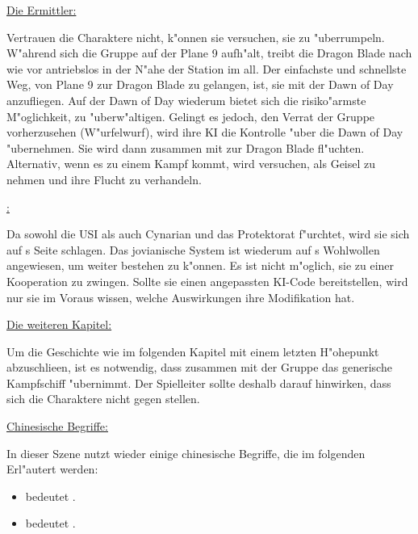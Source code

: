 \begin{remarks}	
	\underline{Die Ermittler:}
	
	Vertrauen die Charaktere \xl{} nicht, k"onnen sie versuchen, sie zu "uberrumpeln. W"ahrend sich die Gruppe auf der Plane 9 aufh"alt, treibt die Dragon Blade nach wie vor antriebslos in der N"ahe der Station im all. Der einfachste und schnellste Weg, von Plane 9 zur Dragon Blade zu gelangen, ist, sie mit der Dawn of Day anzufliegen. Auf der Dawn of Day wiederum bietet sich die risiko"armste M"oglichkeit, \xl{} zu "uberw"altigen. Gelingt es \xl{} jedoch, den Verrat der Gruppe vorherzusehen (W"urfelwurf), wird ihre KI die Kontrolle "uber die Dawn of Day "ubernehmen. Sie wird dann zusammen mit \ml{} zur Dragon Blade fl"uchten. Alternativ, wenn es zu einem Kampf kommt, wird \xl{} versuchen, \ml{} als Geisel zu nehmen und ihre Flucht zu verhandeln.

	\underline{\ml{}:}

	Da \ml{} sowohl die USI als auch Cynarian und das Protektorat f"urchtet, wird sie sich auf \xl{}s Seite schlagen. Das jovianische System ist wiederum auf \ml{}s Wohlwollen angewiesen, um weiter bestehen zu k"onnen. Es ist nicht m"oglich, sie zu einer Kooperation zu zwingen. Sollte sie einen angepassten KI-Code bereitstellen, wird nur sie im Voraus wissen, welche Auswirkungen ihre Modifikation hat.

	\underline{Die weiteren Kapitel:}

	Um die Geschichte wie im folgenden Kapitel mit einem letzten H"ohepunkt abzuschlie\3en, ist es notwendig, dass \xl{} zusammen mit der Gruppe das generische Kampfschiff "ubernimmt. Der Spielleiter sollte deshalb darauf hinwirken, dass sich die Charaktere nicht gegen \xl{} stellen.

	\underline{Chinesische Begriffe:}

	In dieser Szene nutzt \xl{} wieder einige chinesische Begriffe, die im folgenden Erl"autert werden:

	\begin{itemize}
		\item {} bedeutet .
		\item {} bedeutet .		
	\end{itemize}
	 
\end{remarks}
